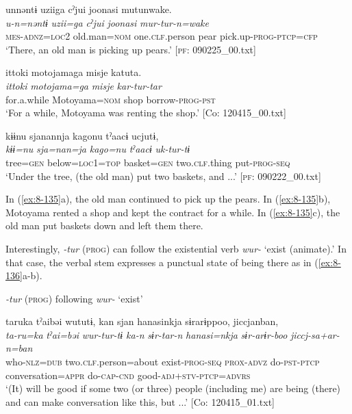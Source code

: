 \ea
{\TM}
\glll  unnəntɨ  uziiga  cˀjui  joonasi      mutunwake.\\
\textit{u-n=nəntɨ}  \textit{uzii=ga}  \textit{cˀjui}  \textit{joonasi}      \textit{mur-tur-n=wake}\\
\textsc{mes}-\textsc{adnz}=\textsc{loc}2  old.man=\textsc{nom}  one.\textsc{clf}.person  pear  pick.up-\textsc{prog}-\textsc{ptcp}=\textsc{cfp}\\
\glt ‘There, an old man is picking up pears.’ [\textsc{pf}: 090225\_00.txt]

\ex [= (\ref{ex:6-134}a)]

{\TM}
\glll  {\textbar}ittoki{\textbar}  motojamaga  misje  katuta.\\
\textit{ittoki}  \textit{motojama=ga}  \textit{misje}  \textit{kar-tur-tar}\\
for.a.while  Motoyama=\textsc{nom}  shop  borrow-\textsc{prog}-\textsc{pst}\\
\glt ‘For a while, Motoyama was renting the shop.’ [Co: 120415\_00.txt]

\ex [= (\ref{ex:6-62}a)]

{\TM}
\glll  kɨɨnu  sjanannja  kagonu  tˀaacɨ  ucjutɨ,\\
\textit{kɨɨ=nu}  \textit{sja=nan=ja}  \textit{kago=nu}  \textit{tˀaacɨ}  \textit{uk-tur-tɨ}\\
tree=\textsc{gen}  below=\textsc{loc}1=\textsc{top}  basket=\textsc{gen}  two.\textsc{clf}.thing  put-\textsc{prog}-\textsc{seq}\\
\glt ‘Under the tree, (the old man) put two baskets, and ...’ [\textsc{pf}: 090222\_00.txt]
\z
\z

In (\ref{ex:8-135}a), the old man continued to pick up the pears. In (\ref{ex:8-135}b), Motoyama rented a shop and kept the contract for a while. In (\ref{ex:8-135}c), the old man put baskets down and left them there.

  Interestingly, \textit{-tur} (\textsc{prog}) can follow the existential verb \textit{wur-} ‘exist (animate).’ In that case, the verbal stem expresses a punctual state of being there as in (\ref{ex:8-136}a-b).

\ea\label{ex:8-136}
  \textit{-tur} (\textsc{prog}) following \textit{wur-} ‘exist’


{\TM}
\glll  taruka  tˀaibəi  wututɨ,  kan    sjan  hanasinkja  sɨrarɨppoo,  jiccjanban,\\
\textit{ta-ru=ka}  \textit{tˀai=bəi}  \textit{wur-tur-tɨ  ka-n}    \textit{sɨr-tar-n}  \textit{hanasi=nkja}  \textit{sɨr-arɨr-boo}  \textit{jiccj-sa+ar-n=ban}\\
who-\textsc{nlz}=\textsc{dub}  two.\textsc{clf}.person=about  exist-\textsc{prog}-\textsc{seq}  \textsc{prox}-\textsc{advz}  do-\textsc{pst}-\textsc{ptcp}  conversation=\textsc{appr}  do-\textsc{cap}-\textsc{cnd}  good-\textsc{adj}+\textsc{stv}-\textsc{ptcp}=\textsc{advrs}\\
\glt ‘(It) will be good if some two (or three) people (including me) are being (there) and can make conversation like this, but ...’ [Co: 120415\_01.txt]

